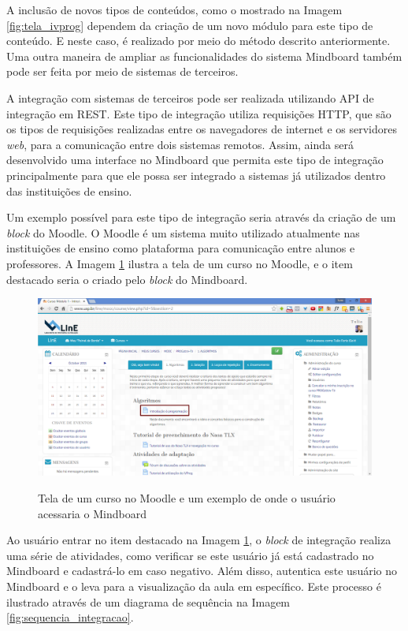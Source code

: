 A inclusão de novos tipos de conteúdos, como o mostrado na Imagem \ref{fig:tela_ivprog} dependem da criação de um novo módulo para este tipo de conteúdo. E neste caso, é realizado por meio do método descrito anteriormente. Uma outra maneira de ampliar as funcionalidades do sistema Mindboard também pode ser feita por meio de sistemas de terceiros.

A integração com sistemas de terceiros pode ser realizada utilizando API de integração em REST. Este tipo de integração utiliza requisições HTTP, que são os tipos de requisições realizadas entre os navegadores de internet e os servidores \emph{web}, para a comunicação entre dois sistemas remotos. Assim, ainda será desenvolvido uma interface no Mindboard que permita este tipo de integração principalmente para que ele possa ser integrado a sistemas já utilizados dentro das instituições de ensino.

Um exemplo possível para este tipo de integração seria através da criação de um \emph{block} do Moodle. O Moodle é um sistema muito utilizado atualmente nas instituições de ensino como plataforma para comunicação entre alunos e professores. A Imagem \ref{fig:tela_moodle} ilustra a tela de um curso no Moodle, e o item destacado seria o criado pelo \emph{block} do Mindboard.

\begin{figure}
\centering
\caption{Tela de um curso no Moodle e um exemplo de onde o usuário acessaria o Mindboard}
\includegraphics[width=1.0\textwidth]{imgs/tela_moodle.png} 
\label{fig:tela_moodle} 
\end{figure}

Ao usuário entrar no item destacado na Imagem \ref{fig:tela_moodle}, o \emph{block} de integração realiza uma série de atividades, como verificar se este usuário já está cadastrado no Mindboard e cadastrá-lo em caso negativo. Além disso, autentica este usuário no Mindboard e o leva para a visualização da aula em específico. Este processo é ilustrado através de um diagrama de sequência na Imagem \ref{fig:sequencia_integracao}.

